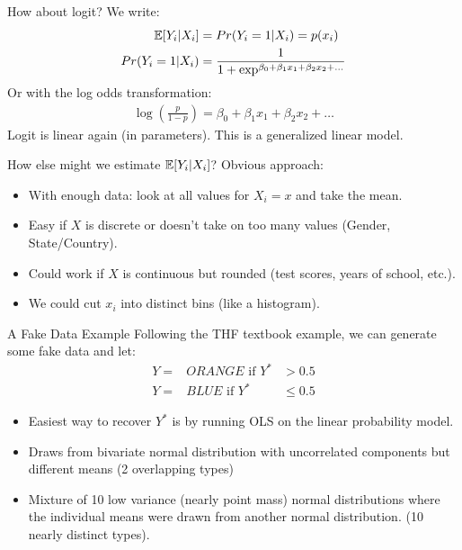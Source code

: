 \begin{frame}{How about logit?}
We write:
\begin{align*}
\mathbb{E}[Y_i | X_i] &= Pr(Y_i =1 | X_i) = p(x_i)\\
 Pr(Y_i =1 | X_i)  &= \frac{1}{1+\exp^{\beta_0 + \beta_1 x_1 + \beta_2 x_2 + \ldots}}
\end{align*}
Or with the log odds transformation:
\begin{align*}
\log \left(\frac{p}{1-p} \right) =\beta_0 + \beta_1 x_1 + \beta_2 x_2 + \ldots
\end{align*}
Logit is \alert{linear} again (in parameters). This is a \alert{generalized linear model}.
\end{frame}

\begin{frame}{How else might we estimate $\mathbb{E}[Y_i | X_i]$?}
Obvious approach:
\begin{itemize}
\item With enough data: look at all values for $X_i = x$ and take the mean.
\item Easy if $X$ is discrete or doesn't take on too many values (Gender, State/Country).
\item Could work if $X$ is continuous but rounded (test scores, years of school, etc.).
\item We could cut $x_i$ into distinct bins (like a histogram).
\end{itemize}
\end{frame}


\begin{frame}{A Fake Data Example}
Following the THF textbook example, we can generate some fake data and let: 
\begin{eqnarray*}
Y=&ORANGE \mbox{ if } Y^{*} &> 0.5 \\
Y=&BLUE  \mbox{ if }   Y^{*} &\leq 0.5
\end{eqnarray*}
\begin{itemize}
\item Easiest way to recover $Y^{*}$ is by running OLS on the linear probability model.
\item Draws from bivariate normal distribution with uncorrelated components but different means (2 overlapping types)
\item Mixture of 10 low variance (nearly point mass) normal distributions where the individual means were drawn from another normal distribution. (10 nearly distinct types).
\end{itemize}
\end{frame}

